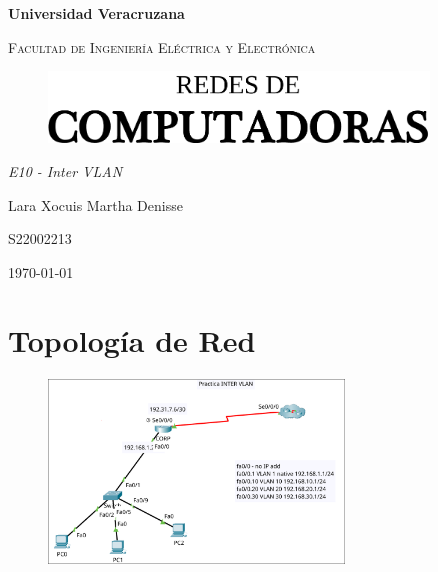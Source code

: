 \documentclass[letterpaper,12pt]{article}
\begin{document}
\thispagestyle{empty}
\newpage
\setcounter{page}{1}
\pagestyle{headings}
\begin{sloppypar} 
\begin{titlepage}
    \hspace{2.5cm}
    {\bfseries\LARGE Universidad Veracruzana \par}
    \hspace{2cm}
    {\scshape\Large Facultad de Ingeniería Eléctrica y Electrónica \par}
    \begin{center}
        \vspace{5cm}
        \begin{figure}[H]
            \centering 
            \includegraphics[width=0.9\textwidth]{PORTADA.png}
        \end{figure}
        \vspace{2cm}
        {\itshape\Large E10 - Inter VLAN \par}
        {\large Lara Xocuis Martha Denisse \par}
        {\large S22002213 \par}
        \vfill
        {\Large \today \par}
    \end{center}
    
\end{titlepage} 

\section{Topología de Red}
\begin{figure}[H]
    \centering 
    \includegraphics[width=0.7\textwidth]{swappy-20240428-004521.png}
\end{figure}


\end{sloppypar}
\end{document}

